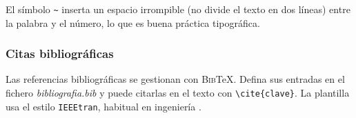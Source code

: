 El símbolo \lstinline|~| inserta un espacio irrompible (no divide el texto en dos líneas) entre la palabra y el número, lo que es buena práctica tipográfica.

\subsubsection*{Citas bibliográficas}

Las referencias bibliográficas se gestionan con \textsc{Bib}\TeX{}. Defina sus entradas en el fichero \textit{bibliografia.bib} y puede citarlas en el texto con \lstinline|\cite{clave}|. La plantilla usa el estilo \lstinline{IEEEtran}, habitual en ingeniería \cite{latexproject}.